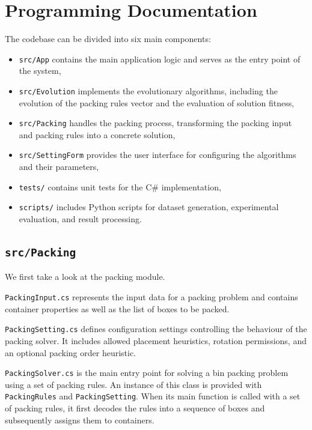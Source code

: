 \chapter{Programming Documentation}
\label{app:program}

The codebase can be divided into six main components:

\begin{itemize}
    \item \texttt{src/App} contains the main application logic and serves as the entry point of the system,
    
    \item \texttt{src/Evolution} implements the evolutionary algorithms, including the evolution of the packing rules vector and the evaluation of solution fitness,
    
    \item \texttt{src/Packing} handles the packing process, transforming the packing input and packing rules into a concrete solution,
    
    \item \texttt{src/SettingForm} provides the user interface for configuring the algorithms and their parameters,
    
    \item \texttt{tests/} contains unit tests for the C\# implementation,
    
    \item \texttt{scripts/} includes Python scripts for dataset generation, experimental evaluation, and result processing.
\end{itemize}

\section{\texttt{src/Packing}}

We first take a look at the packing module.

\texttt{PackingInput.cs} represents the input data for a packing problem
and contains container properties as well as the list of boxes to be packed.

\texttt{PackingSetting.cs} defines configuration settings controlling the behaviour
of the packing solver. It includes allowed placement heuristics, rotation permissions,
and an optional packing order heuristic.

\texttt{PackingSolver.cs} is the main entry point for solving a bin packing problem
using a set of packing rules. An instance of this class is provided with \texttt{PackingRules}
and \texttt{PackingSetting}. When its main function is called with a set of packing rules,
it first decodes the rules into a sequence of boxes and subsequently assigns them to containers.

